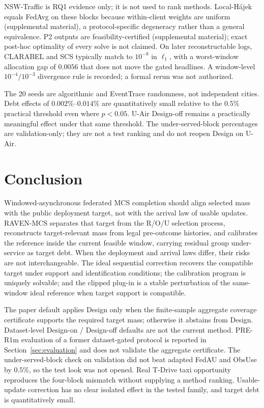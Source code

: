 \documentclass[letterpaper,journal]{IEEEtran}
\begin{document}
NSW-Traffic is RQ1 evidence only; it is not used to rank methods.
Local-H\'ajek equals FedAvg on these blocks because within-client
weights are uniform (supplemental material), a
protocol-specific degeneracy rather than a general equivalence.
P2 outputs are feasibility-certified
(supplemental material); exact post-hoc optimality of every
solve is not claimed.  On later reconstructable logs, CLARABEL and SCS
typically match to $10^{-8}$ in $\ell_1$, with a worst-window
allocation gap of $0.0056$ that does not move the gated headlines.  A window-level $10^{-4}/10^{-3}$ divergence rule is
recorded; a formal rerun was not authorized.

The $20$ seeds are algorithmic and EventTrace randomness, not
independent cities.  Debt effects of $0.002\%$--$0.014\%$ are
quantitatively small relative to the $0.5\%$ practical threshold even
where $p<0.05$.  U-Air Design-off remains a practically meaningful
effect under that same threshold.  The under-served-block percentages
are validation-only; they are not a test ranking and do not reopen
Design on U-Air.


\section{Conclusion}
\label{sec:conclusion}

Windowed-asynchronous federated MCS completion should align selected
mass with the public deployment target, not with the arrival law of
usable updates.  RAVEN-MCS separates that target from the R/O/U
selection process, reconstructs target-relevant mass from legal
pre-outcome histories, and calibrates the reference inside the current
feasible window, carrying residual group under-service as target debt.
When the deployment and arrival laws differ, their risks are not
interchangeable.  The ideal sequential correction recovers the
compatible target under support and identification conditions; the
calibration program is uniquely solvable; and the clipped plug-in is a
stable perturbation of the same-window ideal reference when target
support is compatible.

The paper default applies Design only when the finite-sample aggregate
coverage certificate supports the required target mass; otherwise it
abstains from Design.  Dataset-level Design-on / Design-off defaults are
not the current method.  PRE-R1m evaluation of a former dataset-gated
protocol is reported in Section~\ref{sec:evaluation} and does not
validate the aggregate certificate.
The under-served-block check on validation did not beat adapted FedAU and
ObsUse by $0.5\%$, so the test look was not opened.  Real T-Drive taxi
opportunity reproduces the four-block
mismatch without supplying a method ranking.  Usable-update correction
has no clear isolated effect in the tested family, and target debt is
quantitatively small.
\end{document}
